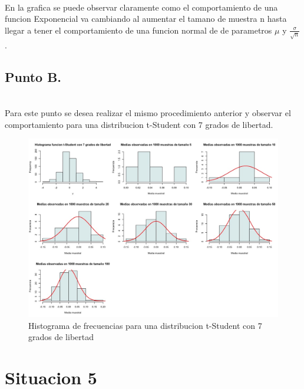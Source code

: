 \documentclass[letterpaper,12pt,onecolumn,titlepage]{article}
\begin{document}
~\\En la grafica se puede observar claramente como el comportamiento de una funcion Exponencial va cambiando al aumentar el tamano de muestra n hasta llegar a tener el comportamiento de una funcion normal de de parametros $\mu$ y $\frac{\sigma}{\sqrt{n}}$. 
\subsection{Punto B.}
~\\ Para este punto se desea realizar el mismo procedimiento anterior y observar el comportamiento para una distribucion t-Student con 7 grados de libertad.
\begin{figure}[!h]
    \begin{center}
        \includegraphics[width=15cm]{figuras/4b.jpeg}
        \caption{Histograma de frecuencias para una distribucion t-Student con 7 grados de libertad}
        \label{fig:Densidad}
    \end{center}
\end{figure}

\section{Situacion 5}
\end{document}
